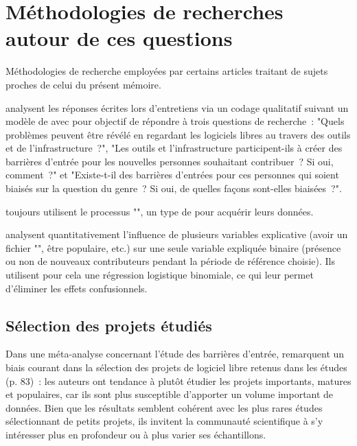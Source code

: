 \section{Méthodologies de recherches autour de ces questions}

Méthodologies de recherche employées par certains articles traitant de sujets proches de celui du présent
mémoire.

\textcite[p.~1006]{barriers-2018} analysent les réponses écrites lors d'entretiens via un codage
qualitatif suivant un modèle de  avec pour objectif de répondre à trois questions
de recherche : "Quels problèmes peuvent être révélé en regardant les logiciels libres au travers des outils et
de l'infrastructure ?", "Les outils et l'infrastructure participent-ils à créer des barrières d'entrée pour
les nouvelles personnes souhaitant contribuer ? Si oui, comment ?" et "Existe-t-il des barrières d'entrées
pour ces personnes qui soient biaisés sur la question du genre ? Si oui, de quelles façons sont-elles
biaisées ?".

\textcite[p.~1006]{barriers-2018} toujours utilisent le processus "", un type de  pour acquérir leurs données.

 analysent quantitativement l'influence de plusieurs variables explicative
(avoir un fichier "", être populaire, etc.) sur une seule variable expliquée binaire
(présence ou non de nouveaux contributeurs pendant la période de référence choisie). Ils utilisent pour cela
une régression logistique binomiale, ce qui leur permet d'éliminer les effets confusionnels.

\subsection{Sélection des projets étudiés}

Dans une méta-analyse concernant l'étude des barrières d'entrée,  remarquent
un biais courant dans la sélection des projets de logiciel libre retenus dans les études (p. 83) : les auteurs
ont tendance à plutôt étudier les projets importants, matures et populaires, car ils sont plus susceptible
d'apporter un volume important de données. Bien que les résultats semblent cohérent avec les plus rares études
sélectionnant de petits projets, ils invitent la communauté scientifique à s'y intéresser plus en profondeur
ou à plus varier ses échantillons.

